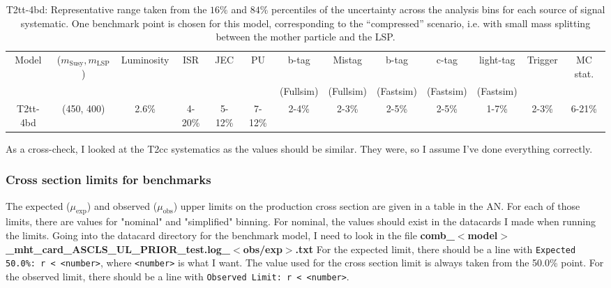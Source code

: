 \begin{landscape}
\begin{table}[H]
    \label{tab:T2tt-4bdSUS16038systs}
    \centering
    \small
    \begin{tabular}{ ccccccccccccc }
        \hline \hline
        Model & ($m_{\mathrm{Susy}},m_{\mathrm{LSP}}$) & Luminosity & ISR & JEC & PU & b-tag & Mistag & b-tag & c-tag & light-tag & Trigger & MC stat. \\
        & & & & & & (Fullsim) & (Fullsim) & (Fastsim) & (Fastsim) & (Fastsim) & & \\ \hline
        T2tt-4bd & (450, 400) & 2.6\% & 4-20\% & 5-12\% & 7-12\% & 2-4\% & 2-3\% & 2-5\% & 2-5\% & 1-7\% & 2-3\% & 6-21\% \\
        \hline \hline
        \end{tabular}
    \caption{T2tt-4bd: Representative range taken from the $16\%$ and $84\%$ percentiles of the uncertainty across the analysis bins for each source of signal systematic. One benchmark point is chosen for this model, corresponding to the ``compressed'' scenario, i.e. with small mass splitting between the mother particle and the LSP.}
\end{table}
\end{landscape}

As a cross-check, I looked at the T2cc systematics as the values should be similar. They were, so I assume I've done everything correctly.



\subsubsection{Cross section limits for benchmarks}

The expected ($\mu_{\mathrm{exp}}$) and observed ($\mu_{\mathrm{obs}}$) upper limits on the production cross section are given in a table in the AN. For each of those limits, there are values for "nominal" and "simplified" binning. For nominal, the values should exist in the datacards I made when running the limits. Going into the datacard directory for the benchmark model, I need to look in the file \textbf{comb\_$<$model$>$\_mht\_card\_ASCLS\_UL\_PRIOR\_test.log\_$<$obs/exp$>$.txt} For the expected limit, there should be a line with \texttt{Expected 50.0\%: r < <number>}, where \texttt{<number>} is what I want. The value used for the cross section limit is always taken from the 50.0\% point. For the observed limit, there should be a line with \texttt{Observed Limit: r < <number>}.

